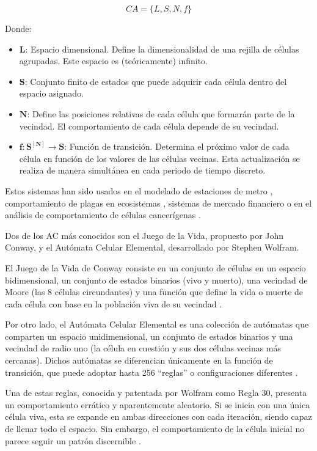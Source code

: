 \documentclass[12pt,twoside]{article}
\begin{document}
	\begin{equation*} CA = \{L, S, N, f\} \end{equation*}
	
	Donde: 
	\begin{itemize} \item $\boldsymbol{L}$: Espacio dimensional. Define la dimensionalidad de una rejilla de células agrupadas. Este espacio es (teóricamente) infinito.

		\item $\boldsymbol{S}$: Conjunto finito de estados que puede adquirir cada célula dentro del espacio asignado.
		
		\item $\boldsymbol{N}$: Define las posiciones relativas de cada célula que formarán parte de la vecindad. El comportamiento de cada célula depende de su vecindad.
		
		\item $\boldsymbol{f : S^{[N]} \rightarrow S}$: Función de transición. Determina el próximo valor de cada célula en función de los valores de las células vecinas. Esta actualización se realiza de manera simultánea en cada periodo de tiempo discreto.
	\end{itemize}
	
	Estos sistemas han sido usados en el modelado de estaciones de metro \cite{b2}, comportamiento de plagas en ecosistemas \cite{b3}, sistemas de mercado financiero \cite{b4} o en el análisis de comportamiento de células cancerígenas \cite{b5}.
	
	Dos de los AC más conocidos son el Juego de la Vida, propuesto por John Conway, y el Autómata Celular Elemental, desarrollado por Stephen Wolfram.
	
	El Juego de la Vida de Conway consiste en un conjunto de células en un espacio bidimensional, un conjunto de estados binarios (vivo y muerto), una vecindad de Moore (las 8 células circundantes) y una función que define la vida o muerte de cada célula con base en la población viva de su vecindad \cite{b6}.
	
	Por otro lado, el Autómata Celular Elemental es una colección de autómatas que comparten un espacio unidimensional, un conjunto de estados binarios y una vecindad de radio uno (la célula en cuestión y sus dos células vecinas más cercanas). Dichos autómatas se diferencian únicamente en la función de transición, que puede adoptar hasta 256 ``reglas'' o configuraciones diferentes \cite{b7}.
	
	Una de estas reglas, conocida y patentada por Wolfram como Regla 30, presenta un comportamiento errático y aparentemente aleatorio. Si se inicia con una única célula viva, esta se expande en ambas direcciones con cada iteración, siendo capaz de llenar todo el espacio. Sin embargo, el comportamiento de la célula inicial no parece seguir un patrón discernible \cite{b8}.
	
\end{document}
